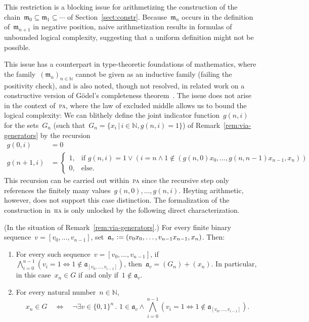\documentclass[envcountsect,envcountsame,runningheads]{llncs}
\newcommand{\aaa}{\mathfrak{a}}
\newcommand{\mmm}{\mathfrak{m}}
\newcommand{\NN}{\mathbb{N}}
\newcommand{\defeq}{\vcentcolon=}
\renewcommand{\_}{\mathpunct{.}\,}
\begin{document}
This restriction is a blocking issue for arithmetizing the
construction of the chain~$\mmm_0 \subseteq \mmm_1 \subseteq \cdots$
of Section~\ref{sect:constr}. Because~$\mmm_n$ occurs in the
definition of~$\mmm_{n+1}$ in negative position, naive arithmetization
results in formulas of unbounded logical complexity, suggesting that
a uniform definition might not be possible.

This issue has a counterpart in type-theoretic foundations of mathematics,
where the family~$(\mmm_n)_{n \in \NN}$ cannot be given as an inductive family
(failing the positivity check), and is also noted, though not resolved, in
related work on a constructive version of Gödel's completeness
theorem~\cite[p.~11]{herbelin-ilik:henkin}.
The issue does not arise in the context of~\textsc{pa}, where the law of
excluded middle allows us to bound the logical complexity: We can blithely define
the joint indicator function~$g(n,i)$ for the sets~$G_n$ (such that~$G_n = \{
x_i \,|\, i \in \NN, g(n,i) = 1 \}$) of Remark~\ref{rem:via-generators} by the recursion
\begin{align*}
  g(0,i) &= 0 \\
  g(n+1,i) &= \begin{cases}
    1, & \text{if $g(n,i) = 1 \vee (i = n \wedge 1 \not\in
    (g(n,0)x_0,\ldots,g(n,n-1)x_{n-1},x_n))$} \\
    0, & \text{else.}
  \end{cases}
\end{align*}
This recursion can be carried out within~\textsc{pa} since the recursive step
only references the finitely many values~$g(n,0),\ldots,g(n,i)$.
Heyting arithmetic, however, does not support this case distinction. The
formalization of the construction in~\textsc{ha} is only unlocked by the following
direct characterization.

\begin{lemma}\label{lemma:uniform-char}(In the situation of Remark~\ref{rem:via-generators}.)
For every finite binary sequence~$v = [v_0,\ldots,v_{n-1}]$, set~$\aaa_v
\defeq (v_0x_0,\ldots,v_{n-1}x_{n-1},x_n)$. Then:
\begin{enumerate}
\item For every such sequence~$v = [v_0,\ldots,v_{n-1}]$, if
$\bigwedge_{i=0}^{n-1} (v_i = 1 \Leftrightarrow 1 \not\in \aaa_{[v_0,\ldots,v_{i-1}]})$,
then~$\aaa_v = (G_n) + (x_n)$.
In particular, in this case~$x_n \in G$ if and only if~$1 \not\in \aaa_v$.
\item For every natural number~$n \in \NN$,
\vspace*{-1.2em}
\[ x_n \in G \quad\Longleftrightarrow\quad \neg
  \exists v \in \{0,1\}^n\_
    1 \in \aaa_v \wedge
      \bigwedge_{i=0}^{n-1} (v_i = 1 \Leftrightarrow 1 \not\in \aaa_{[v_0,\ldots,v_{i-1}]}). \]
\end{enumerate}
\end{lemma}
\end{document}
